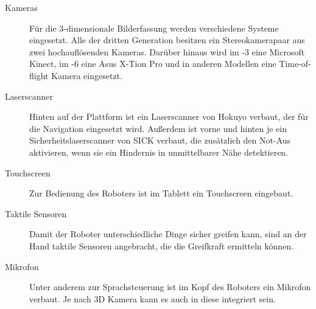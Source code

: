 \begin{description}
  \item[Kameras] Für die 3-dimensionale Bilderfassung werden
    verschiedene Systeme eingesetzt. Alle \cob der dritten Generation
    besitzen ein Stereokamerapaar aus zwei hochauflösenden Kameras.
    Darüber hinaus wird im -3 eine Microsoft Kinect, im -6 eine
    Asus X-Tion Pro und in anderen Modellen eine Time-of-flight Kamera
    eingesetzt. 
  \item[Laserscanner] Hinten auf der Plattform ist ein
    Laserscanner von Hokuyo verbaut, der für die Navigation eingesetzt wird.
    Außerdem ist vorne und hinten je ein Sicherheitslaserscanner von SICK
    verbaut, die zusätzlich den Not-Aus aktivieren, wenn sie ein Hindernis in
    unmittelbarer Nähe detektieren. 
  \item[Touchscreen] Zur Bedienung des
    Roboters ist im Tablett ein Touchscreen eingebaut. 
  \item[Taktile Sensoren]
    Damit der Roboter unterschiedliche Dinge sicher greifen kann, sind an der
    Hand taktile Sensoren angebracht, die die Greifkraft ermitteln können.
  \item[Mikrofon] Unter anderem zur Sprachsteuerung ist im Kopf des Roboters ein
    Mikrofon verbaut. Je nach 3D Kamera kann es auch in diese integriert sein.
\end{description}


%
%

